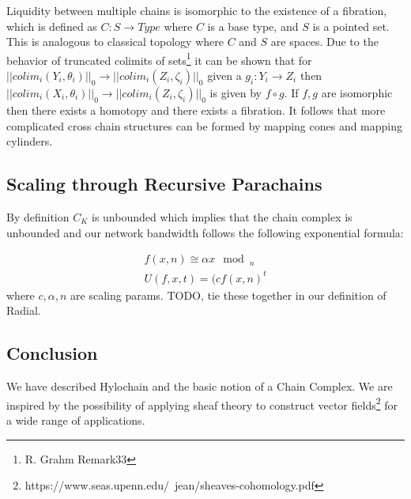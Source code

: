 \documentclass{article}
\begin{document}
Liquidity between multiple chains is isomorphic to the existence of a fibration, which is defined as $C: S \rightarrow Type$ where $C$ is a base type, and $S$ is a pointed set. This is analogous to classical topology where $C$ and $S$ are spaces. Due to the behavior of truncated colimits of sets\footnote{R. Grahm Remark33} it can be shown that for $ || colim_i (Y_i,\theta_i) ||_0 \rightarrow || colim_i (Z_i,\zeta_i) ||_0$ given a $g_i: Y_i  \rightarrow Z_i$ then $|| colim_i (X_i,\theta_i) ||_0 \rightarrow || colim_i (Z_i,\zeta_i) ||_0$ is given by $f \circ g$. If $f,g$ are isomorphic then there exists a homotopy and there exists a fibration. It follows that more complicated cross chain structures can be formed by mapping cones and mapping cylinders.

\subsection{Scaling through Recursive Parachains}
By definition $C_K$ is unbounded which implies that the chain complex is unbounded and our network bandwidth follows the following exponential formula:

\begin{equation} \label{eq1}
\begin{split}
f(x, n) \cong \alpha x \mod_n \\
U(f, x, t) = (c f(x, n)^t
\end{split}
\end{equation}
where $c, \alpha, n$ are scaling params. TODO, tie these together in our definition of Radial.

\subsection{Conclusion}
We have described Hylochain and the basic notion of a Chain Complex. We are inspired by the possibility of applying sheaf theory to construct vector fields\footnote{https://www.seas.upenn.edu/~jean/sheaves-cohomology.pdf} for a wide range of applications.


\end{document}
